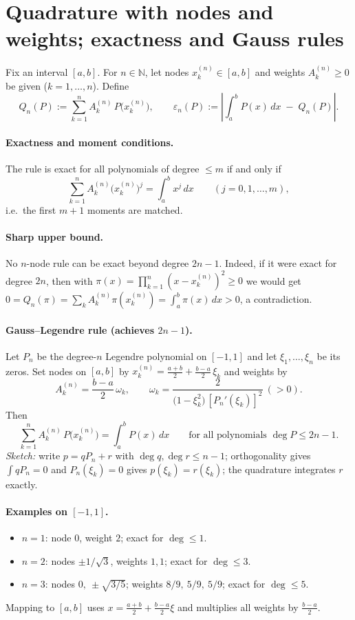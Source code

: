 \documentclass[11pt,a4paper]{article}
\theoremstyle{definition}
\theoremstyle{definition}
\theoremstyle{plain}
\theoremstyle{remark}
\begin{document}
\section*{Quadrature with nodes and weights; exactness and Gauss rules}

Fix an interval $[a,b]$. For $n\in\mathbb N$, let nodes $x_k^{(n)}\in[a,b]$ and weights $A_k^{(n)}\ge 0$ be given
($k=1,\dots,n$). Define
\[
Q_n(P):=\sum_{k=1}^n A_k^{(n)}\,P\!\bigl(x_k^{(n)}\bigr),\qquad
\varepsilon_n(P):=\left|\int_a^b P(x)\,dx\;-\;Q_n(P)\right|.
\]

\paragraph{Exactness and moment conditions.}
The rule is exact for all polynomials of degree $\le m$ if and only if
\[
\sum_{k=1}^n A_k^{(n)}\bigl(x_k^{(n)}\bigr)^j=\int_a^b x^j\,dx\qquad (j=0,1,\dots,m),
\]
i.e.\ the first $m{+}1$ moments are matched.

\paragraph{Sharp upper bound.}
No $n$-node rule can be exact beyond degree $2n-1$. Indeed, if it were exact for degree $2n$,
then with $\pi(x)=\prod_{k=1}^n(x-x_k^{(n)})^2\ge 0$ we would get
$0=Q_n(\pi)=\sum_{k} A_k^{(n)}\pi(x_k^{(n)})=\int_a^b \pi(x)\,dx>0$, a contradiction.

\paragraph{Gauss--Legendre rule (achieves $2n{-}1$).}
Let $P_n$ be the degree-$n$ Legendre polynomial on $[-1,1]$ and let $\xi_1,\dots,\xi_n$ be its zeros.
Set nodes on $[a,b]$ by $x_k^{(n)}=\frac{a+b}{2}+\frac{b-a}{2}\,\xi_k$ and weights by
\[
A_k^{(n)}=\frac{b-a}{2}\,\omega_k,\qquad
\omega_k=\frac{2}{\bigl(1-\xi_k^2\bigr)\,[P_n'(\xi_k)]^2}\ (>0).
\]
Then
\[
\sum_{k=1}^n A_k^{(n)}\,P\!\bigl(x_k^{(n)}\bigr)=\int_a^b P(x)\,dx
\qquad\text{for all polynomials } \deg P\le 2n-1.
\]
\emph{Sketch:} write $p=qP_n+r$ with $\deg q,\deg r\le n-1$; orthogonality gives $\int qP_n=0$ and
$P_n(\xi_k)=0$ gives $p(\xi_k)=r(\xi_k)$; the quadrature integrates $r$ exactly.

\paragraph{Examples on $[-1,1]$.}
\begin{itemize}
	\item $n=1$: node $0$, weight $2$; exact for $\deg\le 1$.
	\item $n=2$: nodes $\pm 1/\sqrt{3}$, weights $1,1$; exact for $\deg\le 3$.
	\item $n=3$: nodes $0,\ \pm\sqrt{3/5}$; weights $8/9,\ 5/9,\ 5/9$; exact for $\deg\le 5$.
\end{itemize}
Mapping to $[a,b]$ uses $x=\frac{a+b}{2}+\frac{b-a}{2}\xi$ and multiplies all weights by $\frac{b-a}{2}$.
\end{document}

